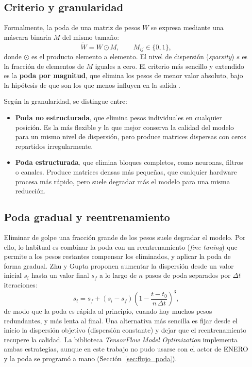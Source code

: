 \subsection{Criterio y granularidad}

Formalmente, la poda de una matriz de pesos $W$ se expresa mediante una máscara binaria $M$ del mismo tamaño:
\begin{equation}\label{eq:mascara}
	\tilde{W} = W \odot M, \qquad M_{ij} \in \{0,1\},
\end{equation}
donde $\odot$ es el producto elemento a elemento. El nivel de dispersión (\textit{sparsity}) $s$ es la fracción de elementos de $M$ iguales a cero. El criterio más sencillo y extendido es la \textbf{poda por magnitud}, que elimina los pesos de menor valor absoluto, bajo la hipótesis de que son los que menos influyen en la salida \cite{han2015learning}.

Según la granularidad, se distingue entre:
\begin{itemize}
	\item \textbf{Poda no estructurada}, que elimina pesos individuales en cualquier posición. Es la más flexible y la que mejor conserva la calidad del modelo para un mismo nivel de dispersión, pero produce matrices dispersas con ceros repartidos irregularmente.
	\item \textbf{Poda estructurada}, que elimina bloques completos, como neuronas, filtros o canales. Produce matrices densas más pequeñas, que cualquier hardware procesa más rápido, pero suele degradar más el modelo para una misma reducción.
\end{itemize}

\subsection{Poda gradual y reentrenamiento}

Eliminar de golpe una fracción grande de los pesos suele degradar el modelo. Por ello, lo habitual es combinar la poda con un reentrenamiento (\textit{fine-tuning}) que permite a los pesos restantes compensar los eliminados, y aplicar la poda de forma gradual. Zhu y Gupta \cite{zhu2017prune} proponen aumentar la dispersión desde un valor inicial $s_i$ hasta un valor final $s_f$ a lo largo de $n$ pasos de poda separados por $\Delta t$ iteraciones:
\begin{equation}\label{eq:poda_gradual}
	s_t = s_f + (s_i - s_f)\left(1 - \frac{t - t_0}{n\,\Delta t}\right)^{3},
\end{equation}
de modo que la poda es rápida al principio, cuando hay muchos pesos redundantes, y más lenta al final. Una alternativa más sencilla es fijar desde el inicio la dispersión objetivo (dispersión constante) y dejar que el reentrenamiento recupere la calidad. La biblioteca \textit{TensorFlow Model Optimization} implementa ambas estrategias, aunque en este trabajo no pudo usarse con el actor de ENERO y la poda se programó a mano (Sección~\ref{sec:flujo_poda}).

